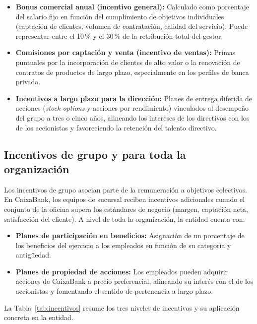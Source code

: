 \begin{itemize}
    \item \textbf{Bonus comercial anual (incentivo general):} Calculado como porcentaje del salario fijo en función del cumplimiento de objetivos individuales (captación de clientes, volumen de contratación, calidad del servicio). Puede representar entre el 10\,\% y el 30\,\% de la retribución total del gestor.
    \item \textbf{Comisiones por captación y venta (incentivo de ventas):} Primas puntuales por la incorporación de clientes de alto valor o la renovación de contratos de productos de largo plazo, especialmente en los perfiles de banca privada.
    \item \textbf{Incentivos a largo plazo para la dirección:} Planes de entrega diferida de acciones (\textit{stock options} y acciones por rendimiento) vinculados al desempeño del grupo a tres o cinco años, alineando los intereses de los directivos con los de los accionistas y favoreciendo la retención del talento directivo.
\end{itemize}

\subsection{Incentivos de grupo y para toda la organización}

Los incentivos de grupo asocian parte de la remuneración a objetivos colectivos. En CaixaBank, los equipos de sucursal reciben incentivos adicionales cuando el conjunto de la oficina supera los estándares de negocio (margen, captación neta, satisfacción del cliente). A nivel de toda la organización, la entidad cuenta con:

\begin{itemize}
    \item \textbf{Planes de participación en beneficios:} Asignación de un porcentaje de los beneficios del ejercicio a los empleados en función de su categoría y antigüedad.
    \item \textbf{Planes de propiedad de acciones:} Los empleados pueden adquirir acciones de CaixaBank a precio preferencial, alineando su interés con el de los accionistas y fomentando el sentido de pertenencia a largo plazo.
\end{itemize}

La Tabla~\ref{tab:incentivos} resume los tres niveles de incentivos y su aplicación concreta en la entidad.

